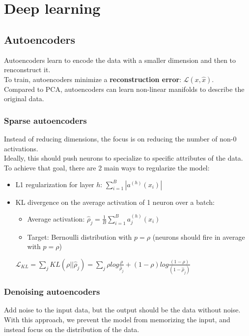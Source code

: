 \documentclass[../main]{subfiles}
\begin{document}
\chapter{Deep learning}
\section{Autoencoders}

Autoencoders learn to encode the data with a smaller dimension and then to renconstruct it. \\
To train, autoencoders minimize a \textbf{reconstruction error}: $\mathcal{L}(x, \hat{x})$. \\
Compared to PCA, autoencoders can learn non-linear manifolds to describe the original data.

\subsection{Sparse autoencoders}
Instead of reducing dimensions, the focus is on reducing the number of non-0 activations. \\
Ideally, this should push neurons to specialize to specific attributes of the data. \\
To achieve that goal, there are 2 main ways to regularize the model:
\begin{itemize}
    \item L1 regularization for layer $h$: $\sum_{i=1}^{B} | a^{(h)}(x_i)|$
    \item KL divergence on the average activation of 1 neuron over a batch:
          \begin{itemize}
              \item Average activation: $\hat{\rho}_j = \frac{1}{B}\sum_{i=1}^{B} a_j^{(h)}(x_i)$
              \item Target: Bernoulli distribution with $p=\rho$ (neurons should fire in average with $p=\rho$)
          \end{itemize}
          $\mathcal{L}_{KL} = \sum_{j} KL(\rho || \hat{\rho}_j) = \sum_j \rho log \frac{\rho}{\hat{\rho}_j} +
              (1 - \rho) log \frac{(1 - \rho)}{(1 - \hat{\rho}_j)}$
\end{itemize}

\subsection{Denoising autoencoders}
Add noise to the input data, but the output should be the data without noise. \\
With this approach, we prevent the model from memorizing the input, and instead focus on the distribution of the data.
\end{document}
